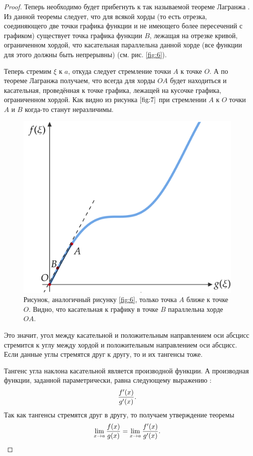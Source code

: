 \documentclass[12pt]{article}
\begin{document}
\begin{proof}
Теперь необходимо будет прибегнуть к так называемой теореме Лагранжа \cite{il-poz}. Из данной теоремы следует, что для всякой хорды (то есть отрезка, соединяющего две точки графика функции и не имеющего более пересечений с графиком) существует точка графика функции $B$, лежащая на отрезке кривой, ограниченном хордой, что касательная параллельна данной хорде (все функции для этого должны быть непрерывны) (см. рис. \ref{fig:6}). 
\par
Теперь стремим $\xi$ к $a$, откуда следует стремление точки $A$ к точке $O$. А по теореме Лагранжа получаем, что всегда для хорды $OA$ будет находиться и касательная, проведённая к точке графика, лежащей на кусочке графика, ограниченном хордой. Как видно из рисунка $\ref{fig:7}$ при стремлении $A$ к $O$ точки $A$ и $B$ когда\--то станут неразличимы.
\begin{figure}
    \centering
    \includegraphics[width = 1\textwidth]{fig7.png}
    \caption{Рисунок, аналогичный рисунку \ref{fig:6}, только точка $A$ ближе к точке $O$. Видно, что касательная к графику в точке $B$ параллельна хорде $OA$.}
    \label{fig:7}
\end{figure}
Это значит, угол между касательной и положительным направлением оси абсцисс стремится к углу между хордой и положительным направлением оси абсцисс. Если данные углы стремятся друг к другу, то и их тангенсы тоже.
\par
Тангенс угла наклона касательной является производной функции. А производная функции, заданной параметрически, равна следующему выражению \cite{il-poz}:
\begin{equation}
    \dfrac{f'\qty(x)}{g'\qty(x)}.
\end{equation}
Так как тангенсы стремятся друг в другу, то получаем утверждение теоремы
\begin{equation}
    \lim_{x\rightarrow a}{\dfrac{f\qty(x)}{g\qty(x)}} = \lim_{x\rightarrow a}{\dfrac{f'\qty(x)}{g'\qty(x)}}.
\end{equation}
\end{proof}
\end{document}
